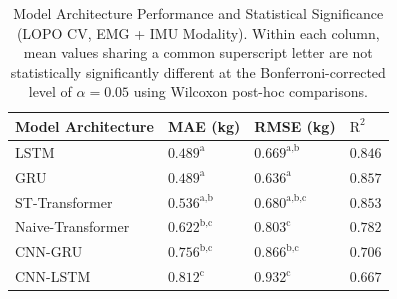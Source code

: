 \begin{table}[h]
    \centering
    \small
    \caption{Model Architecture Performance and Statistical Significance (LOPO CV, EMG + IMU Modality). Within each column, mean values sharing a common superscript letter are not statistically significantly different at the Bonferroni-corrected level of $\alpha = 0.05$ using Wilcoxon post-hoc comparisons.}
    \label{tab:model_comparison_lopo}
    \begin{tabularx}{\columnwidth}{l >{\centering\arraybackslash}X >{\centering\arraybackslash}X >{\centering\arraybackslash}X}
        \toprule
        Model Architecture & MAE (kg) & RMSE (kg) & $\text{R}^2$ \\
        \midrule
        LSTM & $0.489^{\text{a}}$ & $0.669^{\text{a,b}}$ & $0.846$ \\
        GRU & $0.489^{\text{a}}$ & $0.636^{\text{a}}$ & $0.857$ \\
        ST-Transformer & $0.536^{\text{a,b}}$ & $0.680^{\text{a,b,c}}$ & $0.853$ \\
        Naive-Transformer & $0.622^{\text{b,c}}$ & $0.803^{\text{c}}$ & $0.782$ \\
        CNN-GRU & $0.756^{\text{b,c}}$ & $0.866^{\text{b,c}}$ & $0.706$ \\
        CNN-LSTM & $0.812^{\text{c}}$ & $0.932^{\text{c}}$ & $0.667$ \\
        \bottomrule
    \end{tabularx}
\end{table}
